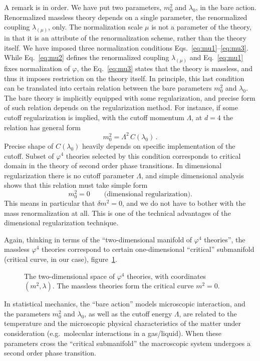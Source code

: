 A remark is in order. We have put two parameters, $m_0^2$ and $\lambda_0$, in the
bare action. Renormalized massless theory depends on a single parameter, the
renormalized coupling $\lambda_{(\mu)}$, only. The normalization scale $\mu$ is
not a parameter of the theory, in that it is an attribute of the renormalization
scheme, rather than the theory itself. We have imposed three normalization
conditions Eqs.~\eqref{eq:mu1}--\eqref{eq:mu3}. While Eq.~\eqref{eq:mu2} defines
the renormalized coupling $\lambda_{(\mu)}$ and Eq.~\eqref{eq:mu1} fixes
normalization of $\varphi$, the Eq.~\eqref{eq:mu3} states that the theory is
massless, and thus it imposes restriction on the theory itself. In principle,
this last condition can be translated into certain relation between the bare
parameters $m_0^2$ and $\lambda_0$. The bare theory is implicitly equipped with
some regularization, and precise form of such relation depends on the
regularization method. For instance, if some cutoff regularization is implied,
with the cutoff momentum $\Lambda$, at $d=4$ the relation has general form
\begin{equation}\label{eq:critbare}
m_0^2=\Lambda^2\,C(\lambda_0)\,.
\end{equation}
Precise shape of $C(\lambda_0)$ heavily depends on specific implementation of the
cutoff. Subset of $\varphi^4$ theories selected by this condition corresponds to
critical domain in the theory of second order phase transitions. In dimensional
regularization there is no cutoff parameter $\Lambda$, and simple dimensional
analysis shows that this relation must take simple form
\[
m_0^2=0\qquad\text{(dimensional regularization)}.
\]
This means in particular that $\delta m^2=0$, and we do not have to bother with
the mass renormalization at all. This is one of the technical advantages of the
dimensional regularization technique.

Again, thinking in terms of the ``two-dimensional manifold of $\varphi^4$
theories'', the massless $\varphi^4$ theories correspond to certain
one-dimensional ``critical'' submanifold (critical curve, in our case),
figure~\ref{fig:critcurve}.
\begin{figure}[ht]
\centering{}
\caption{The two-dimensional space of $\varphi^4$ theories, with coordinates
$(m^2,\lambda)$. The massless theories form the critical curve $m^2=0$.}
\label{fig:critcurve}
\end{figure}
In statistical mechanics, the ``bare action'' models microscopic interaction, and
the parameters $m_0^2$ and $\lambda_0$, as well as the cutoff energy $\Lambda$,
are related to the temperature and the microscopic physical characteristics of
the matter under consideration (e.g.\ molecular interactions in a gas/liquid).
When these parameters cross the ``critical submanifold'' the macroscopic system
undergoes a second order phase transition.

